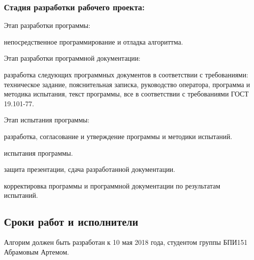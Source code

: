 \subsubsection{Стадия разработки рабочего проекта:}
\begin{my_enumerate}
\item Этап разработки программы:
    \begin{my_enumerate}
    \item непосредственное программирование и отладка алгориттма.
    \end{my_enumerate}
\item Этап разработки программной документации:
    \begin{my_enumerate}
    \item разработка следующих программных документов в соответствии с требованиями: техническое задание, пояснительная записка, руководство оператора, программа и методика испытания, текст программы, все в соответствии с требованиями ГОСТ 19.101-77.
    \end{my_enumerate}
\item Этап испытания программы:    
    \begin{my_enumerate}
    \item разработка, согласование и утверждение программы и методики испытаний.
    \item испытания программы.
    \item защита презентации, сдача разработанной документации.
    \item корректировка программы и программной документации по результатам испытаний.
    \end{my_enumerate}
\end{my_enumerate}


\subsection{Сроки работ и исполнители}
Алгорим должен быть разработан к 10 мая 2018 года, студентом группы БПИ151 Абрамовым Артемом.
